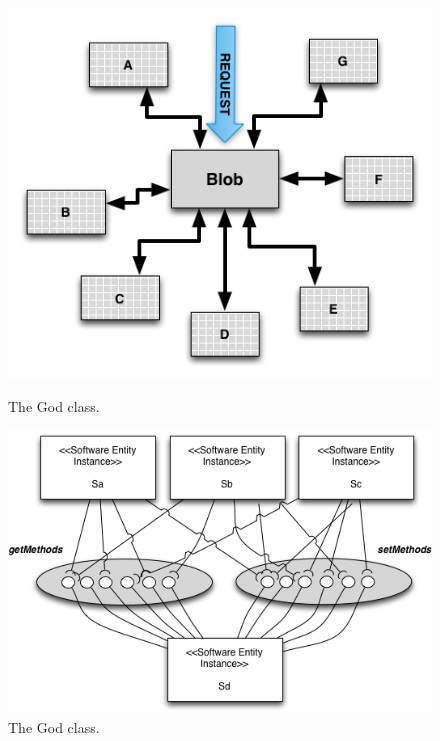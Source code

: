 \documentclass[times]{stvrauth}
\begin{document}
\begin{figure}[h]
\begin{minipage}{.5\textwidth}
\centering
\includegraphics[width=1\textwidth]{./images/BLOB.png}
\caption{The God class\cite{Wert2013a}. }
\label{fig:godclass}
\end{minipage}
\begin{minipage}{.5\textwidth}
\centering
\includegraphics[width=1\textwidth]{./images/blob2.png}
\caption{The God class\cite{Vetoio2011}. }
\label{fig:godclass2}
\end{minipage}
\end{figure}
\end{document}
